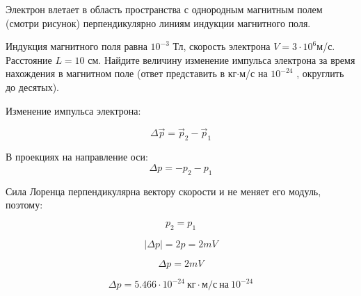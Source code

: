 
Электрон влетает в область пространства с однородным магнитным полем (смотри рисунок) перпендикулярно линиям индукции магнитного поля.


Индукция магнитного поля равна $ 10^{-3} $ Тл, скорость электрона $ V=3\cdot10^6 $м/с. 
Расстояние $ L =10 $ см. Найдите величину изменение импульса электрона за время нахождения в магнитном поле (ответ представить в кг$\cdot$м/с на $10^{-24}$ , округлить до десятых).

\solutionSection

Изменение импульса электрона:

$$\Delta \overrightarrow{p} = \overrightarrow{p}_2 - \overrightarrow{p}_1 $$

В проекциях на направление оси:  
$$ \Delta p = -p_2 - p_1$$

Сила Лоренца перпендикулярна вектору скорости и не меняет 
его модуль, поэтому:

$$p_2 = p_1$$

$$|\Delta p| = 2p=2mV$$

$$\Delta p = 2mV$$

$$\Delta p = 5.466 \cdot 10^{-24} \: \text{кг} \cdot \text{м/с} \: \text{на} \: 10^{-24}$$
 
